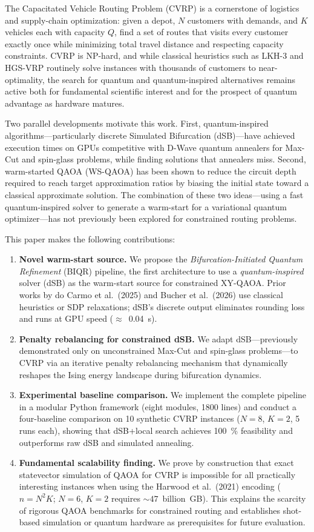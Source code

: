 \documentclass[11pt,a4paper]{article}
\theoremstyle{definition}
\begin{document}
The Capacitated Vehicle Routing Problem (CVRP) is a cornerstone of logistics and supply-chain optimization: given a depot, $N$ customers with demands, and $K$ vehicles each with capacity $Q$, find a set of routes that visits every customer exactly once while minimizing total travel distance and respecting capacity constraints. CVRP is NP-hard, and while classical heuristics such as LKH-3 and HGS-VRP routinely solve instances with thousands of customers to near-optimality, the search for quantum and quantum-inspired alternatives remains active both for fundamental scientific interest and for the prospect of quantum advantage as hardware matures.

Two parallel developments motivate this work. First, quantum-inspired algorithms---particularly discrete Simulated Bifurcation (dSB)---have achieved execution times on GPUs competitive with D-Wave quantum annealers for Max-Cut and spin-glass problems, while finding solutions that annealers miss. Second, warm-started QAOA (WS-QAOA) has been shown to reduce the circuit depth required to reach target approximation ratios by biasing the initial state toward a classical approximate solution. The combination of these two ideas---using a fast quantum-inspired solver to generate a warm-start for a variational quantum optimizer---has not previously been explored for constrained routing problems.

This paper makes the following contributions:
\begin{enumerate}
    \item \textbf{Novel warm-start source.} We propose the \emph{Bifurcation-Initiated Quantum Refinement} (BIQR) pipeline, the first architecture to use a \emph{quantum-inspired} solver (dSB) as the warm-start source for constrained XY-QAOA. Prior works by do Carmo et al.\ (2025) and Bucher et al.\ (2026) use classical heuristics or SDP relaxations; dSB's discrete output eliminates rounding loss and runs at GPU speed ($\approx$~\SI{0.04}{s}).
    \item \textbf{Penalty rebalancing for constrained dSB.} We adapt dSB---previously demonstrated only on unconstrained Max-Cut and spin-glass problems---to CVRP via an iterative penalty rebalancing mechanism that dynamically reshapes the Ising energy landscape during bifurcation dynamics.
    \item \textbf{Experimental baseline comparison.} We implement the complete pipeline in a modular Python framework (eight modules, \num{1800} lines) and conduct a four-baseline comparison on \num{10} synthetic CVRP instances ($N=8$, $K=2$, \num{5} runs each), showing that dSB+local search achieves \SI{100}{\percent} feasibility and outperforms raw dSB and simulated annealing.
    \item \textbf{Fundamental scalability finding.} We prove by construction that exact statevector simulation of QAOA for CVRP is impossible for all practically interesting instances when using the Harwood et al.\ (2021) encoding ($n = N^2 K$; $N=6$, $K=2$ requires $\sim 47$~billion~GB). This explains the scarcity of rigorous QAOA benchmarks for constrained routing and establishes shot-based simulation or quantum hardware as prerequisites for future evaluation.
\end{enumerate}
\end{document}
